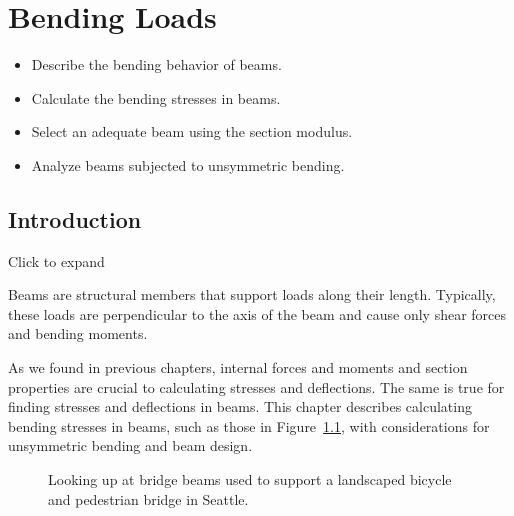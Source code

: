 \documentclass[
  letterpaper,
  DIV=11,
  numbers=noendperiod]{scrreprt}
\providecommand{\tightlist}{%
  \setlength{\itemsep}{0pt}\setlength{\parskip}{0pt}}\usepackage{longtable,booktabs,array}
\theoremstyle{definition}
\theoremstyle{remark}
\begin{document}

\chapter{Bending Loads}\label{sec-bending-loads}

\begin{tcolorbox}[enhanced jigsaw, left=2mm, toptitle=1mm, breakable, coltitle=black, colbacktitle=quarto-callout-note-color!10!white, opacitybacktitle=0.6, bottomrule=.15mm, titlerule=0mm, leftrule=.75mm, colframe=quarto-callout-note-color-frame, bottomtitle=1mm, opacityback=0, title={Learning Objectives}, arc=.35mm, colback=white, rightrule=.15mm, toprule=.15mm]

\begin{itemize}
\tightlist
\item
  Describe the bending behavior of beams.
\item
  Calculate the bending stresses in beams.
\item
  Select an adequate beam using the section modulus.
\item
  Analyze beams subjected to unsymmetric bending.
\end{itemize}

\end{tcolorbox}

\section*{Introduction}\label{introduction-8}


Click to expand

Beams are structural members that support loads along their length.
Typically, these loads are perpendicular to the axis of the beam and
cause only shear forces and bending moments.\,

As we found in previous chapters, internal forces and moments and
section properties are crucial to calculating stresses and deflections.
The same is true for finding stresses and deflections in beams. This
chapter describes calculating bending stresses in beams, such as those
in Figure~\ref{fig-9.1}, with considerations for unsymmetric bending and
beam design.

\begin{figure}


\caption{\label{fig-9.1}Looking up at bridge beams used to support a
landscaped bicycle and pedestrian bridge in Seattle.}

\end{figure}%
\end{document}

